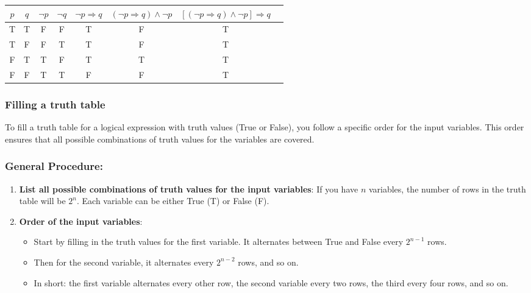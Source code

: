 \begin{center}
\begin{tabular}{|c|c|c|c|c|c|c|c|}
\hline
$p$ & $q$ & $\neg p$ & $\neg q$ & $\neg p \Rightarrow q$ & $(\neg p \Rightarrow q) \land \neg p$ & $\left[(\neg p \Rightarrow q) \land \neg p\right] \Rightarrow q$ \\
\hline
T & T & F & F & T & F & T \\
T & F & F & T & T & F & T \\
F & T & T & F & T & T & T \\
F & F & T & T & F & F & T \\
\hline
\end{tabular}
\end{center}

\subsubsection{Filling a truth table}
\smallskip
To fill a truth table for a logical expression with truth values (True or False), you follow a specific order for the input variables. This order ensures that all possible combinations of truth values for the variables are covered.

\subsubsection{General Procedure:}
\begin{enumerate}
    \item \textbf{List all possible combinations of truth values for the input variables}: If you have \(n\) variables, the number of rows in the truth table will be \(2^n\). Each variable can be either True (T) or False (F).
   
    \item \textbf{Order of the input variables}:
    \begin{itemize}
        \item Start by filling in the truth values for the first variable. It alternates between True and False every \(2^{n-1}\) rows.
        \item Then for the second variable, it alternates every \(2^{n-2}\) rows, and so on.
        \item In short: the first variable alternates every other row, the second variable every two rows, the third every four rows, and so on.
    \end{itemize}
\end{enumerate}

